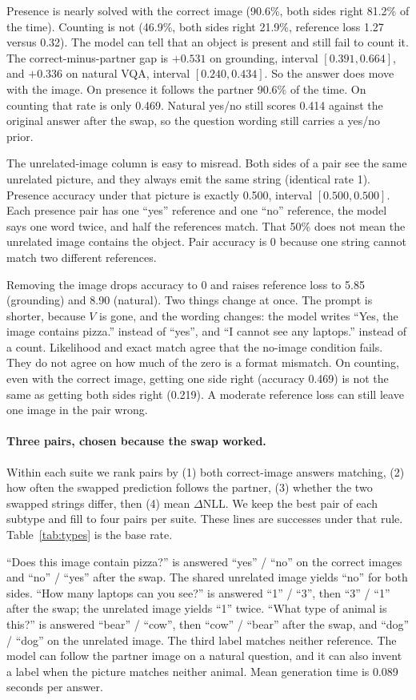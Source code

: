 \documentclass[10pt]{article}
\begin{document}
Presence is nearly solved with the correct image (90.6\%, both sides right 81.2\% of the time).
Counting is not (46.9\%, both sides right 21.9\%, reference loss 1.27 versus 0.32).
The model can tell that an object is present and still fail to count it.
The correct-minus-partner gap is $+0.531$ on grounding, interval $[0.391,0.664]$, and $+0.336$ on natural VQA, interval $[0.240,0.434]$.
So the answer does move with the image.
On presence it follows the partner 90.6\% of the time.
On counting that rate is only 0.469.
Natural yes/no still scores 0.414 against the original answer after the swap, so the question wording still carries a yes/no prior.

The unrelated-image column is easy to misread.
Both sides of a pair see the same unrelated picture, and they always emit the same string (identical rate 1).
Presence accuracy under that picture is exactly 0.500, interval $[0.500,0.500]$.
Each presence pair has one ``yes'' reference and one ``no'' reference, the model says one word twice, and half the references match.
That 50\% does not mean the unrelated image contains the object.
Pair accuracy is 0 because one string cannot match two different references.

Removing the image drops accuracy to 0 and raises reference loss to 5.85 (grounding) and 8.90 (natural).
Two things change at once.
The prompt is shorter, because $V$ is gone, and the wording changes: the model writes ``Yes, the image contains pizza.'' instead of ``yes'', and ``I cannot see any laptops.'' instead of a count.
Likelihood and exact match agree that the no-image condition fails.
They do not agree on how much of the zero is a format mismatch.
On counting, even with the correct image, getting one side right (accuracy 0.469) is not the same as getting both sides right (0.219).
A moderate reference loss can still leave one image in the pair wrong.

\paragraph{Three pairs, chosen because the swap worked.}
Within each suite we rank pairs by (1) both correct-image answers matching, (2) how often the swapped prediction follows the partner, (3) whether the two swapped strings differ, then (4) mean $\Delta$NLL.
We keep the best pair of each subtype and fill to four pairs per suite.
These lines are successes under that rule.
Table~\ref{tab:types} is the base rate.

``Does this image contain pizza?'' is answered ``yes'' / ``no'' on the correct images and ``no'' / ``yes'' after the swap.
The shared unrelated image yields ``no'' for both sides.
``How many laptops can you see?'' is answered ``1'' / ``3'', then ``3'' / ``1'' after the swap; the unrelated image yields ``1'' twice.
``What type of animal is this?'' is answered ``bear'' / ``cow'', then ``cow'' / ``bear'' after the swap, and ``dog'' / ``dog'' on the unrelated image.
The third label matches neither reference.
The model can follow the partner image on a natural question, and it can also invent a label when the picture matches neither animal.
Mean generation time is 0.089 seconds per answer.
\end{document}

